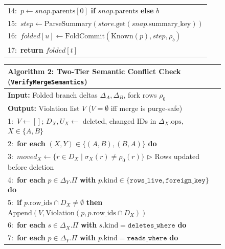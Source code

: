 \documentclass[sigconf, nonacm]{acmart}
\begin{document}
\begin{figure}[t]
\begin{tabularx}{\columnwidth}{@{}X@{}}
14:\ \hspace{2em}$p \gets \mathit{snap}.\text{parents}[0]$ \textbf{if} $\mathit{snap}.\text{parents}$ \textbf{else} $b$ \\
15:\ \hspace{2em}$\mathit{step} \gets \text{ParseSummary}(\mathit{store}.\text{get}(\mathit{snap}.\text{summary\_key}))$ \\
16:\ \hspace{2em}$\mathit{folded}[u] \gets \text{FoldCommit}(\text{Known}(p), \mathit{step}, \rho_b)$ \\
17:\ \textbf{return} $\mathit{folded}[t]$ \\
\bottomrule
\end{tabularx}
\end{figure}

\begin{figure}[t]
\centering
\scriptsize
\begin{tabularx}{\columnwidth}{@{}X@{}}
\toprule
\textbf{Algorithm 2:} Two-Tier Semantic Conflict Check (\texttt{VerifyMergeSemantics}) \\
\midrule
\textbf{Input:} Folded branch deltas $\Delta_A, \Delta_B$, fork rows $\rho_0$ \\
\textbf{Output:} Violation list $V$ ($V = \emptyset$ iff merge is purge-safe) \\
1:\ $V \gets []$;\; $D_X, U_X \gets$ deleted, changed IDs in $\Delta_X.\text{ops}$, $X \in \{A, B\}$ \\
2:\ \textbf{for each} $(X, Y) \in \{(A, B), (B, A)\}$ \textbf{do} \\
3:\ \hspace{1em}$\mathit{moved}_X \gets \{r \in D_X \mid \sigma_X(r) \neq \rho_0(r)\}$ \hfill $\triangleright$ Rows updated before deletion \\
4:\ \hspace{1em}\textbf{for each} $p \in \Delta_Y.\Pi$ \textbf{with} $p.\text{kind} \in \{\texttt{rows\_live}, \texttt{foreign\_key}\}$ \textbf{do} \\
5:\ \hspace{2em}\textbf{if} $p.\text{row\_ids} \cap D_X \neq \emptyset$ \textbf{then} $\text{Append}(V, \text{Violation}(p, p.\text{row\_ids} \cap D_X))$ \\
6:\ \hspace{1em}\textbf{for each} $s \in \Delta_X.\Pi$ \textbf{with} $s.\text{kind} = \texttt{deletes\_where}$ \textbf{do} \\
7:\ \hspace{2em}\textbf{for each} $p \in \Delta_Y.\Pi$ \textbf{with} $p.\text{kind} = \texttt{reads\_where}$ \textbf{do} \\

\end{tabularx}
\end{figure}
\end{document}

